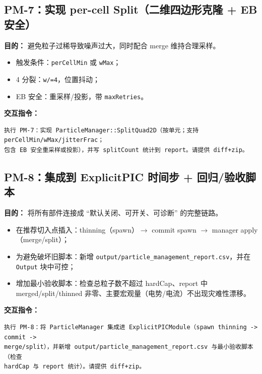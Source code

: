 \documentclass[UTF8,11pt,a4paper]{ctexart}
\begin{document}
\subsection{PM-7：实现 per-cell Split（二维四边形克隆 + EB 安全）}
\textbf{目的：} 避免粒子过稀导致噪声过大，同时配合 merge 维持合理采样。
\begin{itemize}[itemsep=2pt]
  \item 触发条件：\texttt{perCellMin} 或 \texttt{wMax}；
  \item 4 分裂：\texttt{w/=4}，位置抖动；
  \item EB 安全：重采样/投影，带 \texttt{maxRetries}。
\end{itemize}
\textbf{交互指令：}
\begin{verbatim}
执行 PM-7：实现 ParticleManager::SplitQuad2D（按单元；支持 perCellMin/wMax/jitterFrac；
包含 EB 安全重采样或投影），并写 splitCount 统计到 report。请提供 diff+zip。
\end{verbatim}

\subsection{PM-8：集成到 ExplicitPIC 时间步 + 回归/验收脚本}
\textbf{目的：} 将所有部件连接成 ``默认关闭、可开关、可诊断'' 的完整链路。
\begin{itemize}[itemsep=2pt]
  \item 在推荐切入点插入：thinning（spawn）$\to$ commit spawn $\to$ manager apply（merge/split）；
  \item 为避免破坏旧脚本：新增 \texttt{output/particle\_management\_report.csv}，并在 \texttt{Output} 块中可控；
  \item 增加最小验收脚本：检查总粒子数不超过 hardCap、report 中 merged/split/thinned 非零、主要宏观量（电势/电流）不出现灾难性漂移。
\end{itemize}
\textbf{交互指令：}
\begin{verbatim}
执行 PM-8：将 ParticleManager 集成进 ExplicitPICModule（spawn thinning -> commit ->
merge/split），并新增 output/particle_management_report.csv 与最小验收脚本（检查
hardCap 与 report 统计）。请提供 diff+zip。
\end{verbatim}

\end{document}
